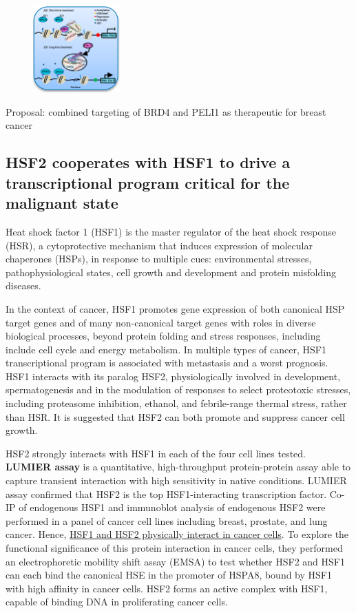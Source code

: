 \begin{figure}
\centering
\includegraphics[width=0.3\textwidth]{../_resources/Screenshot_2022-10-28_at_11-55-04.png}
\caption{}
\end{figure}

Proposal: combined targeting of BRD4 and PELI1 as therapeutic for breast
cancer

\subsection{HSF2 cooperates with HSF1 to drive a transcriptional program critical for the malignant state}

Heat shock factor 1 (HSF1) is the master regulator of the heat shock response (HSR), a cytoprotective mechanism that induces expression of
molecular chaperones (HSPs), in response to multiple cues: environmental stresses, pathophysiological states, cell growth and development and
protein misfolding diseases.

In the context of cancer, HSF1 promotes gene expression of both canonical HSP target genes and of many non-canonical target genes with roles in diverse biological processes, beyond protein folding and stress responses, including include cell cycle and energy metabolism. In multiple types of cancer, HSF1 transcriptional program is associated with metastasis and a worst prognosis. HSF1 interacts with its paralog HSF2, physiologically involved in development, spermatogenesis and in the modulation of responses to select proteotoxic stresses, including proteasome inhibition, ethanol, and febrile-range thermal stress, rather than HSR. It is suggested that HSF2 can both promote and suppress cancer cell growth.

HSF2 strongly interacts with HSF1 in each of the four cell lines tested. \textbf{LUMIER assay} is a quantitative, high-throughput protein-protein assay able to capture transient interaction with high sensitivity in native conditions. LUMIER assay confirmed that HSF2 is the top HSF1-interacting transcription factor. Co-IP of endogenous HSF1 and immunoblot analysis of endogenous HSF2 were performed in a panel of cancer cell lines including breast, prostate, and lung cancer. Hence, \underline{HSF1 and HSF2 physically interact in cancer cells}. To explore the functional significance of this protein interaction in cancer cells, they performed an electrophoretic mobility shift assay (EMSA) to test whether HSF2 and HSF1 can each bind the canonical HSE in the promoter of HSPA8, bound by HSF1 with high affinity in cancer cells. HSF2 forms an active complex with HSF1, capable of binding DNA in proliferating cancer cells.

